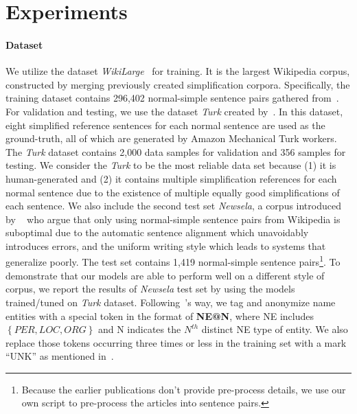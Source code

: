 \documentclass[11pt,a4paper]{article}
\begin{document}
\section{Experiments}



\paragraph{Dataset}

We utilize the dataset \textit{WikiLarge}~\cite{zhang2017sentence} for training. It is the largest Wikipedia corpus, constructed by merging previously created simplification corpora. Specifically, the training dataset contains 296,402 normal-simple sentence pairs gathered from~\cite{zhu2010monolingual, woodsend2011learning, kauchak2013improving}.
For validation and testing, we use the dataset \textit{Turk} created by~\cite{xu2016optimizing}. In this dataset, eight simplified reference sentences for each normal sentence are used as the ground-truth, all of which are generated by Amazon Mechanical Turk workers. The \textit{Turk} dataset contains 2,000 data samples for validation and 356 samples for testing. We consider the \textit{Turk} to be the most reliable data set because (1) it is human-generated and (2) it contains multiple simplification references for each normal sentence due to the existence of multiple equally good simplifications of each sentence.
We also include the second test set \textit{Newsela}, a corpus introduced by ~\cite{xu2015problems} who argue that only using normal-simple sentence pairs from Wikipedia is suboptimal due to the automatic sentence alignment which unavoidably introduces errors, and the uniform writing style which leads to systems that generalize poorly. 
The test set contains 1,419 normal-simple sentence pairs\footnote{Because the earlier publications don't provide pre-process details, we use our own script to pre-process the articles into sentence pairs.}. To demonstrate that our models are able to perform well on a different style of corpus, we report the results of \textit{Newsela} test set by using the models trained/tuned on \textit{Turk} dataset.
Following~\citet{zhang2017sentence}'s way, we tag and anonymize name entities with a special token in the format of \textbf{NE@N}, where NE includes $\left\{PER,LOC,ORG \right\}$ and N indicates the $N^{th}$ distinct NE type of entity. We also replace those tokens occurring three times or less in the training set with a mark ``UNK'' as mentioned in~\cite{zhang2017sentence}.
\end{document}

